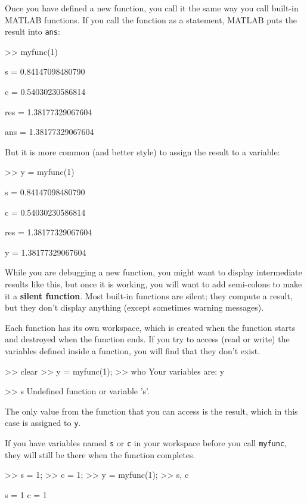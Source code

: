 \documentclass[
]{book}
\numberwithin{Answer}{chapter}
\numberwithin{Exercise}{chapter}
\begin{document}
Once you have defined a new function, you call it the same way you
call built-in MATLAB functions.  If you call the function as a statement,
MATLAB puts the result into {\tt ans}:

\begin{code}
>> myfunc(1)

s = 0.84147098480790

c = 0.54030230586814

res = 1.38177329067604

ans = 1.38177329067604
\end{code}

But it is more common (and better style) to assign the result to
a variable:

\begin{code}
>> y = myfunc(1)

s = 0.84147098480790

c = 0.54030230586814

res = 1.38177329067604

y = 1.38177329067604
\end{code}

While you are debugging a new function, you might want to display
intermediate results like this, but once it is working, you will want
to add semi-colons to make it a {\bf silent function}.  Most built-in
functions are silent; they compute a result, but they don't display
anything (except sometimes warning messages).


Each function has its own workspace, which is created when the
function starts and destroyed when the function ends.  If you try to
access (read or write) the variables defined inside a function, you
will find that they don't exist.

\begin{code}
>> clear
>> y = myfunc(1);
>> who
Your variables are: y

>> s
Undefined function or variable 's'.
\end{code}

The only value from the function that you can access is the result,
which in this case is assigned to {\tt y}.

If you have variables named {\tt s} or {\tt c} in your workspace
before you call {\tt myfunc}, they will still be there when the
function completes.

\begin{code}
>> s = 1;
>> c = 1;
>> y = myfunc(1);
>> s, c

s = 1
c = 1
\end{code}
\end{document}
